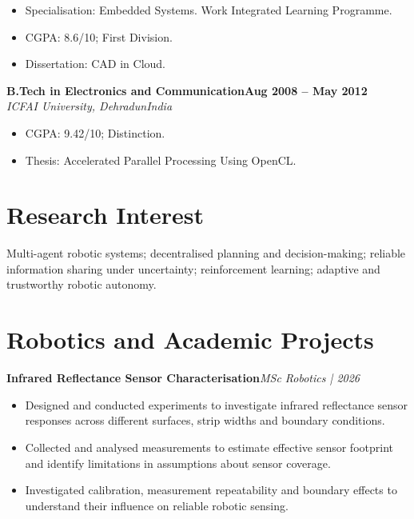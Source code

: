 \documentclass[10pt,a4paper]{article}
\newcommand{\cventry}[4]{
    \textbf{#1}\hfill\textbf{#2}\\
    \textit{#3}\hfill\textit{#4}
    \par
}
\newcommand{\project}[2]{
    \textbf{#1}\hfill\textit{#2}
    \par
}
\begin{document}
\begin{itemize}
    \item Specialisation: Embedded Systems.
    Work Integrated Learning Programme.
    \item CGPA: 8.6/10; First Division.
    \item Dissertation: CAD in Cloud.
\end{itemize}

\cventry
    {B.Tech in Electronics and Communication}
    {Aug 2008 -- May 2012}
    {ICFAI University, Dehradun}
    {India}

\begin{itemize}
    \item CGPA: 9.42/10; Distinction.
    \item Thesis: Accelerated Parallel Processing
    Using OpenCL.
\end{itemize}

\section*{Research Interest}

Multi-agent robotic systems; decentralised planning and
decision-making; reliable information sharing under
uncertainty; reinforcement learning; adaptive and
trustworthy robotic autonomy.

\section*{Robotics and Academic Projects}

\project
    {Infrared Reflectance Sensor Characterisation}
    {MSc Robotics | 2026}

\begin{itemize}
    \item Designed and conducted experiments to
    investigate infrared reflectance sensor
    responses across different surfaces,
    strip widths and boundary conditions.

    \item Collected and analysed measurements
    to estimate effective sensor footprint
    and identify limitations in assumptions
    about sensor coverage.

    \item Investigated calibration, measurement
    repeatability and boundary effects to
    understand their influence on reliable
    robotic sensing.
\end{itemize}
\end{document}
